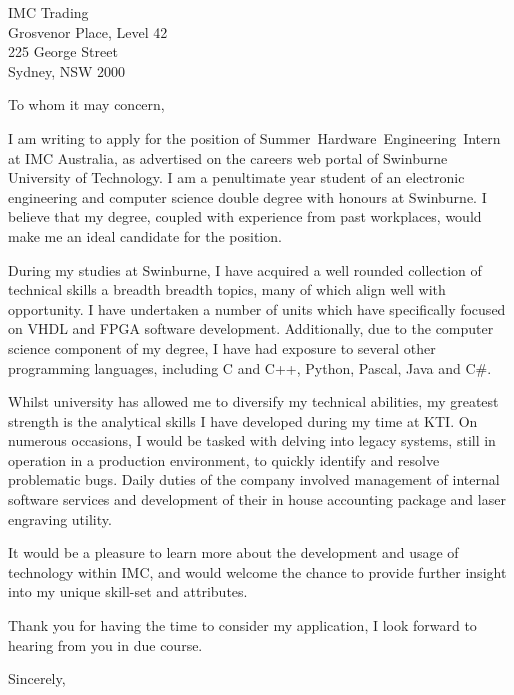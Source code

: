 \documentclass[
    backaddress=false,
    foldmarks=false,
    fromalign=right,
    fromrule,
    fromphone,
    fromemail,
    parskip=half,
    refline=nodate
]{scrlttr2}
\begin{document}
    


    \renewcommand*\raggedsignature{\raggedright}


    \begin{letter}{%
        IMC Trading \\
        Grosvenor Place, Level 42 \\
        225 George Street \\
        Sydney, NSW 2000}
        \opening{To whom it may concern,}
        \raggedbottom
        I am writing to apply for the position of Summer~Hardware~Engineering~Intern at IMC Australia, as advertised on the careers web portal of Swinburne University of Technology. I am a penultimate year student of an electronic engineering and computer science double degree with honours at Swinburne. I believe that my degree, coupled with experience from past workplaces, would make me an ideal candidate for the position.

        During my studies at Swinburne, I have acquired a well rounded collection of technical skills a breadth breadth topics, many of which align well with opportunity. I have undertaken a number of units which have specifically focused on VHDL and FPGA software development. Additionally, due to the computer science component of my degree, I have had exposure to several other programming languages, including C and C++, Python, Pascal, Java and C\#.

        Whilst university has allowed me to diversify my technical abilities, my greatest strength is the analytical skills I have developed during my time at KTI. On numerous occasions, I would be tasked with delving into legacy systems, still in operation in a production environment, to quickly identify and resolve problematic bugs. Daily duties of the company involved management of internal software services and development of their in house accounting package and laser engraving utility.

        It would be a pleasure to learn more about the development and usage of technology within IMC, and would welcome the chance to provide further insight into my unique skill-set and attributes.

        Thank you for having the time to consider my application, I look forward to hearing from you in due course.
        \closing{Sincerely,}
    \end{letter}
\end{document}
